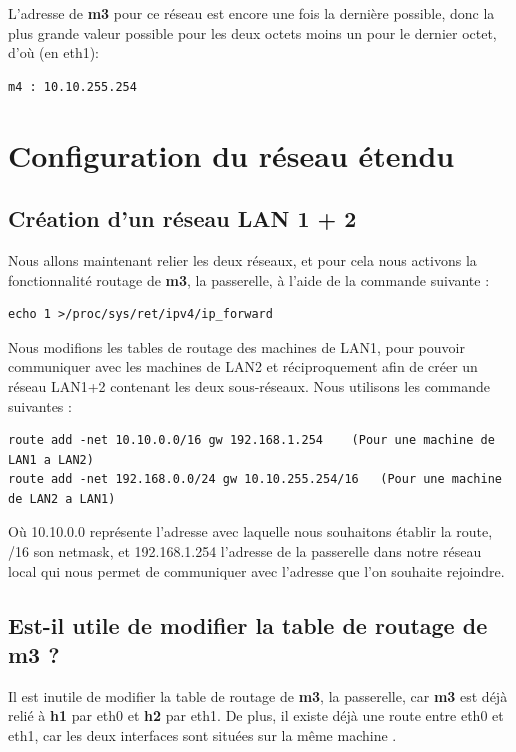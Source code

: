 \documentclass{article}
\begin{document}
L'adresse de \textbf{m3} pour ce réseau est encore une fois la dernière possible, donc la plus grande valeur possible pour les deux octets moins un pour le dernier octet, d'où (en eth1):
\begin{verbatim}
m4 : 10.10.255.254
\end{verbatim}

\section{Configuration du réseau étendu}

\subsection{Création d'un réseau LAN 1 + 2}

Nous allons maintenant relier les deux réseaux, et pour cela nous activons la fonctionnalité routage de \textbf{m3}, la passerelle, à l'aide de la commande suivante :
\begin{verbatim}
echo 1 >/proc/sys/ret/ipv4/ip_forward
\end{verbatim}

Nous modifions les tables de routage des machines de LAN1, pour pouvoir communiquer avec les machines de LAN2 et réciproquement afin de créer un réseau LAN1+2 contenant les deux sous-réseaux. Nous utilisons les commande suivantes :
\begin{verbatim}
route add -net 10.10.0.0/16 gw 192.168.1.254    (Pour une machine de LAN1 a LAN2)	
route add -net 192.168.0.0/24 gw 10.10.255.254/16   (Pour une machine de LAN2 a LAN1)
\end{verbatim}

Où 10.10.0.0 représente l'adresse avec laquelle nous souhaitons établir la route, /16 son netmask, et 192.168.1.254 l'adresse de la passerelle dans notre réseau local qui nous permet de communiquer avec l'adresse que l'on souhaite rejoindre. \newpage

\subsection{Est-il utile de modifier la table de routage de m3 ?}

Il est inutile de modifier la table de routage de \textbf{m3}, la passerelle, car \textbf{m3} est déjà relié à \textbf{h1} par eth0 et \textbf{h2} par eth1. De plus, il existe déjà une route entre eth0 et eth1, car les deux interfaces sont situées sur la même machine .
\end{document}
